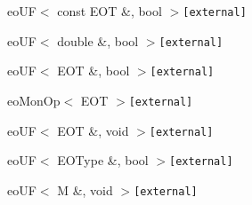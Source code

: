 \begin{CompactList}
\begin{CompactList}
\begin{CompactList}
\begin{CompactList}
\item {}
\end{CompactList}
\end{CompactList}
\item eoUF$<$ const EOT \&, bool $>${\tt  [external]}\begin{CompactList}
\item {}
\begin{CompactList}
\item {}
\end{CompactList}
\end{CompactList}
\item eoUF$<$ double \&, bool $>${\tt  [external]}\begin{CompactList}
\item {}
\begin{CompactList}
\item {}
\item {}
\end{CompactList}
\end{CompactList}
\item eoUF$<$ EOT \&, bool $>${\tt  [external]}\begin{CompactList}
\item eoMonOp$<$ EOT $>${\tt  [external]}\begin{CompactList}
\item {}
\end{CompactList}
\end{CompactList}
\item eoUF$<$ EOT \&, void $>${\tt  [external]}\begin{CompactList}
\item {}
\end{CompactList}
\item eoUF$<$ EOType \&, bool $>${\tt  [external]}\item eoUF$<$ M \&, void $>${\tt  [external]}\begin{CompactList}

\end{CompactList}
\end{CompactList}
\end{CompactList}
